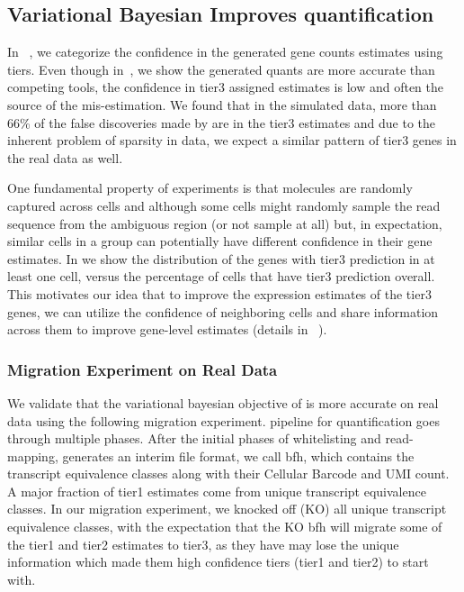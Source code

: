 \subsection{Variational Bayesian Improves \dscrnaseq quantification}
In ~, we categorize the confidence in the generated gene counts estimates using tiers. 
Even though in~, we show the \alevin generated quants are more accurate
than competing tools, the confidence in tier3 assigned estimates is low and often the source of 
the mis-estimation. We found that in the simulated data, more than 66\% of the false discoveries made 
by \alevin are in the tier3 estimates and due to the inherent problem of sparsity in \dscrnaseq data,
we expect a similar pattern of tier3 genes in the real data as well. 

One fundamental property of \dscrnaseq experiments is that molecules are randomly captured across cells 
and although some cells might randomly sample the read sequence from the ambiguous region 
(or not sample at all) but, in expectation, similar cells in a group can potentially have different 
confidence in their gene estimates. In  we show the distribution of the genes with tier3 
prediction in at least one cell, versus the percentage of cells that have tier3 prediction overall.
This motivates our idea that to improve the expression estimates of the tier3 genes, we can utilize the
confidence of neighboring cells and share information across them to improve gene-level estimates 
(details in ~).

\subsubsection{Migration Experiment on Real Data}
We validate that the variational bayesian objective of \alevin is more accurate on real data using the
following migration experiment. \Alevin pipeline for \dscrnaseq quantification goes through multiple 
phases. After the initial phases of whitelisting and read-mapping, \alevin generates an interim 
file format, we call bfh, which contains the transcript equivalence classes along with their Cellular
Barcode and UMI count. A major fraction of tier1 estimates come from unique transcript equivalence
classes. In our migration experiment, we knocked off (KO) all unique transcript equivalence classes, with
the expectation that the KO bfh will migrate some of the tier1 and tier2 estimates to tier3, as they have
may lose the unique information which made them high confidence tiers (tier1 and tier2) to start with. 

